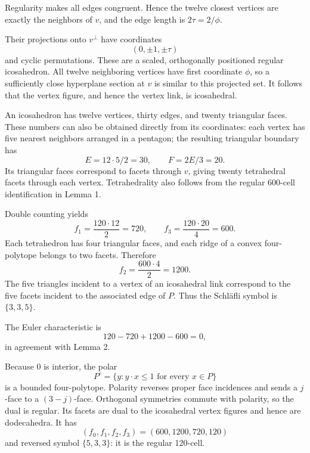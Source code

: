 \documentclass[
  10pt,
  a4paper,
]{article}
\begin{document}
Regularity makes all edges congruent. Hence the twelve closest vertices
are exactly the neighbors of \(v\), and the edge length is
\(2\tau=2/\phi\).

Their projections onto \(v^\perp\) have coordinates \begin{equation}
(0,\pm1,\pm\tau)
\end{equation} and cyclic permutations. These are a scaled, orthogonally
positioned regular icosahedron. All twelve neighboring vertices have
first coordinate \(\phi\), so a sufficiently close hyperplane section at
\(v\) is similar to this projected set. It follows that the vertex
figure, and hence the vertex link, is icosahedral.

An icosahedron has twelve vertices, thirty edges, and twenty triangular
faces. These numbers can also be obtained directly from its coordinates:
each vertex has five nearest neighbors arranged in a pentagon; the
resulting triangular boundary has \begin{equation}
E=12\cdot5/2=30,\qquad F=2E/3=20.
\end{equation} Its triangular faces correspond to facets through \(v\),
giving twenty tetrahedral facets through each vertex. Tetrahedrality
also follows from the regular 600-cell identification in Lemma 1.

Double counting yields \begin{equation}
f_1=\frac{120\cdot12}{2}=720,
\qquad
f_3=\frac{120\cdot20}{4}=600.
\end{equation} Each tetrahedron has four triangular faces, and each
ridge of a convex four-polytope belongs to two facets. Therefore
\begin{equation}
f_2=\frac{600\cdot4}{2}=1200.
\end{equation} The five triangles incident to a vertex of an icosahedral
link correspond to the five facets incident to the associated edge of
\(P\). Thus the Schläfli symbol is \(\{3,3,5\}\).

The Euler characteristic is \begin{equation}
120-720+1200-600=0,
\end{equation} in agreement with Lemma 2.

Because \(0\) is interior, the polar \begin{equation}
P^\circ=\{y:y\cdot x\le1\text{ for every }x\in P\}
\end{equation} is a bounded four-polytope. Polarity reverses proper face
incidences and sends a \(j\)-face to a \((3-j)\)-face. Orthogonal
symmetries commute with polarity, so the dual is regular. Its facets are
dual to the icosahedral vertex figures and hence are dodecahedra. It has
\begin{equation}
(f_0,f_1,f_2,f_3)=(600,1200,720,120)
\end{equation} and reversed symbol \(\{5,3,3\}\): it is the regular
120-cell.
\end{document}
